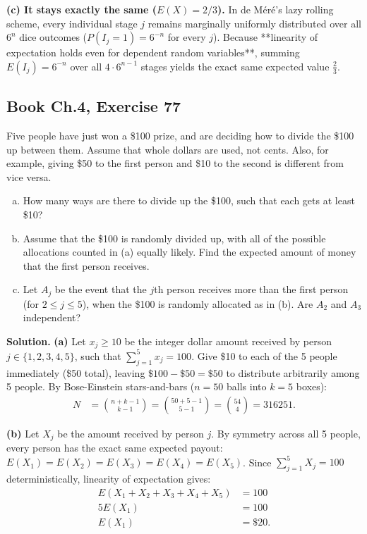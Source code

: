 \documentclass[11pt,a4paper]{article}
\begin{document}
\vspace{4pt}
\noindent \textbf{(c) It stays exactly the same ($E(X) = 2/3$).}
In de Méré's lazy rolling scheme, every individual stage $j$ remains marginally uniformly distributed over all $6^n$ dice outcomes ($P(I_j = 1) = 6^{-n}$ for every $j$). Because **linearity of expectation holds even for dependent random variables**, summing $E(I_j) = 6^{-n}$ over all $4 \cdot 6^{n-1}$ stages yields the exact same expected value $\frac{2}{3}$.

\vspace{10pt}
\subsection{Book Ch.4, Exercise 77}
\begin{tcolorbox}[title={Book Ch.4, Exercise 77}]
Five people have just won a \$100 prize, and are deciding how to divide the \$100 up between them. Assume that whole dollars are used, not cents. Also, for example, giving \$50 to the first person and \$10 to the second is different from vice versa.
\begin{enumerate}[(a)]
\item How many ways are there to divide up the \$100, such that each gets at least \$10?
\item Assume that the \$100 is randomly divided up, with all of the possible allocations counted in (a) equally likely. Find the expected amount of money that the first person receives.
\item Let $A_j$ be the event that the $j$th person receives more than the first person (for $2 \le j \le 5$), when the \$100 is randomly allocated as in (b). Are $A_2$ and $A_3$ independent?
\end{enumerate}
\end{tcolorbox}

\noindent \textbf{Solution.} \textbf{(a)} Let $x_j \ge 10$ be the integer dollar amount received by person $j \in \{1, 2, 3, 4, 5\}$, such that $\sum_{j=1}^{5} x_j = 100$. Give \$10 to each of the 5 people immediately (\$50 total), leaving $\$100 - \$50 = \$50$ to distribute arbitrarily among 5 people. By Bose-Einstein stars-and-bars ($n = 50$ balls into $k = 5$ boxes):
\begin{align*}
N &= \binom{n + k - 1}{k - 1} = \binom{50 + 5 - 1}{5 - 1} = \binom{54}{4} = 316251.
\end{align*}

\vspace{4pt}
\noindent \textbf{(b)} Let $X_j$ be the amount received by person $j$. By symmetry across all 5 people, every person has the exact same expected payout: $E(X_1) = E(X_2) = E(X_3) = E(X_4) = E(X_5)$. Since $\sum_{j=1}^{5} X_j = 100$ deterministically, linearity of expectation gives:
\begin{align*}
E(X_1 + X_2 + X_3 + X_4 + X_5) &= 100 \\
5 E(X_1) &= 100 \\
E(X_1) &= \$20.
\end{align*}
\end{document}
